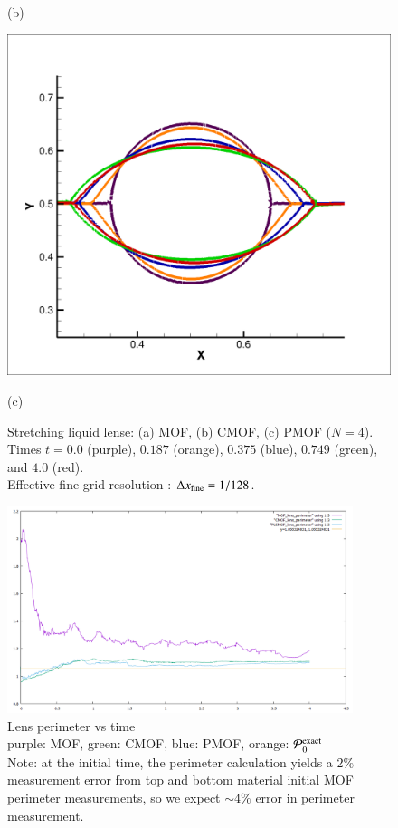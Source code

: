 \documentclass[preprint,12pt]{Definitions/elsarticle}
\newcommand{\tn}{\textnormal}
\begin{document}
\begin{figure}[H]
\begin{minipage}[]{.49\linewidth}
		\caption*{(b)}
		\includegraphics[width=1\textwidth]{PLS_MOF_NOTRUNCATE_LENS.png} 
		\caption*{(c)}
	\end{minipage}
	\caption{Stretching liquid lense: (a) MOF, (b) CMOF, (c) PMOF ($N=4$).\\
			Times $t=0.0$ (purple), $0.187$ (orange), 
			$0.375$ (blue), $0.749$ (green), and $4.0$ (red).\\
			Effective fine grid resolution : $\Delta x_\tn{fine}=1/128$.}
\end{figure}


\begin{figure}[H]
	\centering
	\includegraphics[width=0.9\textwidth]{lensperimeter.png} 
	\caption{Lens perimeter vs time\\
		purple: MOF, green: CMOF, blue: PMOF, orange: $\mathcal{P}^\tn{exact}_{0}$\\
		Note: at the initial time, the perimeter calculation yields a $2\%$ measurement error from top and bottom material initial MOF perimeter measurements, so we expect $\mathtt{\sim}4\%$ error in perimeter measurement.}
	\label{lensperimeter}
\end{figure}
\end{document}
